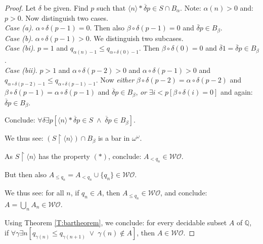 \documentclass[a4paper]{amsart}
\theoremstyle{plain}
\begin{document}
\begin{proof}
   Let $\delta$ be given. 
   Find $p$ such that  $\langle n \rangle \ast \overline \delta p \in S\cap B_\alpha$. Note: $\alpha(n)>0$ and:  $p>0$. Now distinguish two cases.  
   \\{\it Case (a)}. $\alpha\circ \delta (p-1) =0$. Then also $\beta\circ\delta(p-1)=0$ and $\overline \delta p \in B_\beta$.
   \\{\it Case (b)}. $\alpha\circ\delta(p-1)>0$. We distinguish two subcases. 
   \\{\it Case (bi)}. $p=1$ and  $q_{\alpha(n)-1}\le q_{\alpha\circ \delta(0)-1}$. Then $\beta\circ\delta(0) =0$ and  $\overline \delta 1= \overline \delta p \in B_\beta$.
   \\{\it Case (bii)}. $p>1$ and  $\alpha\circ \delta(p-2)>0$ and  $\alpha \circ \delta (p-1)>0$ and \\$q_{\alpha\circ\delta(p-2)-1}\le q_{\alpha\circ\delta(p-1)-1}$. Now {\it either} $\beta \circ \delta(p-2)=\alpha\circ\delta(p-2)$ and $\beta \circ \delta(p-1)=\alpha\circ\delta(p-1)$ and $\overline \delta p \in B_\beta$, {\it or} $\exists i<p[\beta \circ \delta(i) = 0]$ and again: $\overline \delta p \in B_\beta$. 
   
     
   
   Conclude: $\forall \delta \exists p[\langle n \rangle \ast \overline \delta p \in S \;\wedge\; \overline \delta p \in B_\beta]$. 
 
 
 We thus see: $(S\upharpoonright\langle n \rangle)\cap B_\beta$ is a bar in $\omega^\omega$.
 
 
 \smallskip As $S\upharpoonright\langle n \rangle$ has the property $(\ast)$, conclude: $A_{<q_n} \in \mathcal{WO}$.
 
 But then also $A_{\le q_n}= A_{< q_n}\cup\{q_n\} \in \mathcal{WO}$. 
 
 
 \smallskip We thus see: for all $n$, if $q_n\in A$, then $A_{\le q_n} \in \mathcal{WO}$, and conclude: \\$A=\bigcup_n A_n \in \mathcal{WO}$.
 
 \smallskip   Using Theorem \ref{T:bartheorem}, we conclude: for every decidable subset $A$ of $\mathbb{Q}$,\\ if  $\forall \gamma\exists n[q_{\gamma(n)}\le q_{\gamma(n+1)}\;\vee\;\gamma(n)\notin A]$, then $A\in \mathcal{WO}$.
 \end{proof}
 
\end{document}
